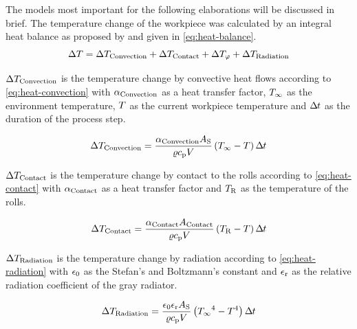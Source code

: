 The models most important for the following elaborations will be discussed in brief.
The temperature change of the workpiece was calculated by an integral heat balance as proposed by \textcite{Hensel1990} and given in \autoref{eq:heat-balance}.
\begin{equation}
    \Delta{T} = {\Delta{T}_\mathrm{Convection}} + {\Delta{T}_\mathrm{Contact}} + \Delta{T}_{{\varphi}} + {\Delta{T}_\mathrm{Radiation}}
    \label{eq:heat-balance}
\end{equation}

\noindent${\Delta{T}_\mathrm{Convection}}$ is the temperature change by convective heat flows according to \autoref{eq:heat-convection} with ${{\alpha}_\mathrm{Convection}}$ as a heat transfer factor, ${{T}_\infty}$ as the environment temperature, ${T}$ as the current workpiece temperature and ${\Delta\mspace{-1mu}t}$ as the duration of the process step.

\begin{equation}
    {\Delta{T}_\mathrm{Convection}} = \frac{{{\alpha}_\mathrm{Convection}} {{A}_\mathrm{S}}}{{\varrho}{c_\mathrm{p}}{V}} \left( {{T}_\infty} - {T} \right) {\Delta\mspace{-1mu}t}
    \label{eq:heat-convection}
\end{equation}

\noindent${\Delta{T}_\mathrm{Contact}}$ is the temperature change by contact to the rolls according to \autoref{eq:heat-contact} with ${{\alpha}_\mathrm{Contact}}$ as a heat transfer factor and ${{T}_\mathrm{R}}$ as the temperature of the rolls.

\begin{equation}
    {\Delta{T}_\mathrm{Contact}} = \frac{{{\alpha}_\mathrm{Contact}} {{A}_\mathrm{Contact}}}{{\varrho}{c_\mathrm{p}}{V}} \left( {{T}_\mathrm{R}} - {T} \right) {\Delta\mspace{-1mu}t}
    \label{eq:heat-contact}
\end{equation}

\noindent${\Delta{T}_\mathrm{Radiation}}$ is the temperature change by radiation according to \autoref{eq:heat-radiation} with ${\epsilon_0}$ as the Stefan's and Boltzmann's constant and ${\epsilon_\mathrm{r}}$ as the relative radiation coefficient of the gray radiator.

\begin{equation}
    {\Delta{T}_\mathrm{Radiation}} = \frac{{\epsilon_0} {\epsilon_\mathrm{r}} {{A}_\mathrm{S}}}{{\varrho}{c_\mathrm{p}}{V}} \left( {{T}_\infty}^4 - {T}^4 \right) {\Delta\mspace{-1mu}t}
    \label{eq:heat-radiation}
\end{equation}

